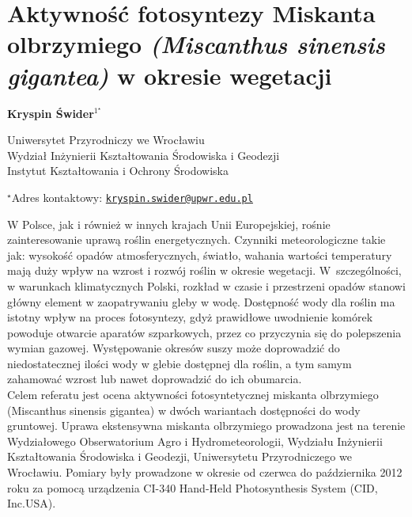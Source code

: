 \documentclass[\main/boa.tex]{subfiles}
\begin{document}
\section{Aktywność fotosyntezy Miskanta olbrzymiego \emph{(Miscanthus sinensis gigantea)} w okresie wegetacji}

\begin{center}
  {\bf {} Kryspin Świder$^{1^\star}$}
\end{center}

\vskip 0.3cm

\begin{affiliations}
\begin{enumerate}
\begin{minipage}{0.915\textwidth}
\centering
\item  Uniwersytet Przyrodniczy we Wrocławiu\\ Wydział Inżynierii Kształtowania Środowiska i Geodezji\\ Instytut Kształtowania i Ochrony Środowiska
\end{minipage}
\end{enumerate}
$^\star$Adres kontaktowy: \href{mailto:kryspin.swider@upwr.edu.pl}{\nolinkurl{kryspin.swider@upwr.edu.pl}}\\
\end{affiliations}

\vskip 0.5cm


\vskip 0.5cm

W Polsce, jak i również w innych krajach Unii Europejskiej, rośnie zainteresowanie uprawą roślin energetycznych. Czynniki meteorologiczne takie jak: wysokość opadów atmosferycznych, światło, wahania wartości temperatury mają duży wpływ na wzrost i rozwój roślin w okresie wegetacji. W~szczególności, w warunkach klimatycznych Polski, rozkład w czasie i przestrzeni opadów stanowi główny element w zaopatrywaniu gleby w wodę. Dostępność wody dla roślin ma istotny wpływ na proces fotosyntezy, gdyż prawidłowe uwodnienie komórek powoduje otwarcie aparatów szparkowych, przez co przyczynia się do polepszenia wymian gazowej. Występowanie okresów suszy może doprowadzić do niedostatecznej ilości wody w glebie dostępnej dla roślin, a tym samym zahamować wzrost lub nawet doprowadzić do ich obumarcia.\\
Celem referatu jest ocena aktywności fotosyntetycznej miskanta olbrzymiego (Miscanthus sinensis gigantea) w dwóch wariantach dostępności do wody gruntowej. Uprawa ekstensywna miskanta olbrzymiego prowadzona jest na terenie Wydziałowego Obserwatorium Agro i Hydrometeorologii, Wydziału Inżynierii Kształtowania Środowiska i Geodezji, Uniwersytetu Przyrodniczego we Wrocławiu. Pomiary były prowadzone w okresie od czerwca do października 2012 roku za pomocą urządzenia CI-340 Hand-Held Photosynthesis System (CID, Inc.USA). 
\end{document}
